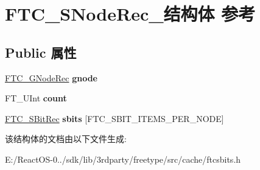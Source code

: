 \hypertarget{struct_f_t_c___s_node_rec__}{}\section{F\+T\+C\+\_\+\+S\+Node\+Rec\+\_\+结构体 参考}
\label{struct_f_t_c___s_node_rec__}
\subsection*{Public 属性}
\begin{DoxyCompactItemize}
\item 
\mbox{\label{struct_f_t_c___s_node_rec___a52a3de3fef9423a3ac1ff56776234b19}} 
\hyperlink{struct_f_t_c___g_node_rec__}{F\+T\+C\+\_\+\+G\+Node\+Rec} {\bfseries gnode}
\item 
\mbox{\label{struct_f_t_c___s_node_rec___af3969cbfd3cde3f8f33ba8c973881361}} 
F\+T\+\_\+\+U\+Int {\bfseries count}
\item 
\mbox{\label{struct_f_t_c___s_node_rec___a2f91dcf10e4b0c8b7ca9169d1c8f3573}} 
\hyperlink{struct_f_t_c___s_bit_rec__}{F\+T\+C\+\_\+\+S\+Bit\+Rec} {\bfseries sbits} \mbox{[}F\+T\+C\+\_\+\+S\+B\+I\+T\+\_\+\+I\+T\+E\+M\+S\+\_\+\+P\+E\+R\+\_\+\+N\+O\+DE\mbox{]}
\end{DoxyCompactItemize}


该结构体的文档由以下文件生成\+:\begin{DoxyCompactItemize}
\item 
E\+:/\+React\+O\+S-\/0../sdk/lib/3rdparty/freetype/src/cache/ftcsbits.\+h\end{DoxyCompactItemize}
